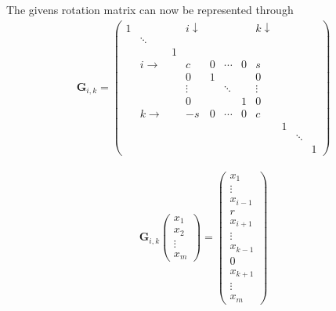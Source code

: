 			The givens rotation matrix can now be represented through
			\begin{align*}
				\mathbf G_{i,k} =
					\left(\begin{array}{ccccccccccc}
						1 & 	& & i\downarrow &&&&k\downarrow	\\
						  & \ddots \\
						  &		  &1&\\
						  &	i\rightarrow	&	& c	& 0 & \cdots & 0 & s\\
						  &		&	& 0 & 1 &		 &	 & 0\\
						  &		&	&\vdots& &\ddots&	 &\vdots\\
						  &		&	& 0 & 	&		 & 1 & 0\\
						  &	k\rightarrow 	&	& -s& 0 &\cdots &0 &c\\
						  &		&	&   &   &       &  & & 1\\
						  &		&	&   &   &       &  & & & \ddots\\
						  &		&	&   &   &       &  & & & & 1
					\end{array}\right)
			\end{align*}

			\begin{align*}
				\mathbf G_{i,k} \begin{pmatrix}
				        	x_1\\
				        	x_2\\
				        	\vdots\\
				        	x_m
				        \end{pmatrix} =
				        \begin{pmatrix}
				        	x_1\\
				        	\vdots\\
				        	x_{i-1}\\
				        	r\\
				        	x_{i+1}\\
				        	\vdots\\
				        	x_{k-1}\\
				        	0\\
				        	x_{k+1}\\
				        	\vdots\\
				        	x_m
				        \end{pmatrix}
			\end{align*}
